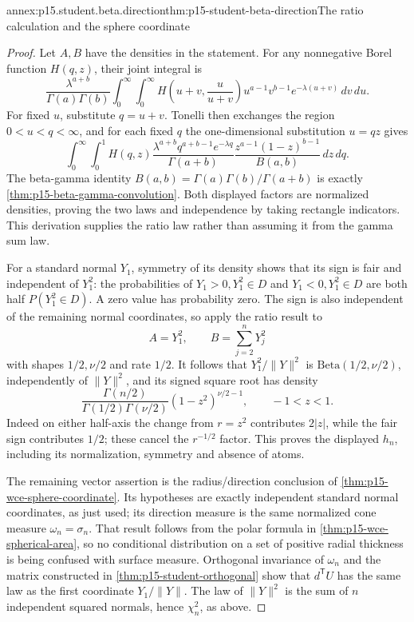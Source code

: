 \begin{annexitem}{annex:p15.student.beta.direction}{thm:p15-student-beta-direction}{The ratio calculation and the sphere coordinate}
\begin{proof}
Let \(A,B\) have the densities in the statement.
For any nonnegative Borel function \(H(q,z)\), their joint
integral is
\[
 \frac{\lambda^{a+b}}{\Gamma(a)\Gamma(b)}
 \int_0^\infty\int_0^\infty
 H\!\left(u+v,\frac{u}{u+v}\right)
 u^{a-1}v^{b-1}e^{-\lambda(u+v)}\,dv\,du .
\]
For fixed \(u\), substitute \(q=u+v\). Tonelli then
exchanges the region \(0<u<q<\infty\), and for each fixed
\(q\) the one-dimensional substitution \(u=qz\) gives
\[
 \int_0^\infty\int_0^1 H(q,z)
 \frac{\lambda^{a+b}q^{a+b-1}e^{-\lambda q}}
      {\Gamma(a+b)}
 \frac{z^{a-1}(1-z)^{b-1}}{B(a,b)}\,dz\,dq .
\]
The beta-gamma identity
\(B(a,b)=\Gamma(a)\Gamma(b)/\Gamma(a+b)\)
is exactly \cref{thm:p15-beta-gamma-convolution}.
Both displayed factors are normalized densities, proving
the two laws and independence by taking rectangle indicators.
This derivation supplies the ratio law rather than assuming
it from the gamma sum law.

For a standard normal \(Y_1\), symmetry of its density
shows that its sign is fair and independent of \(Y_1^2\):
the probabilities of \(Y_1>0,Y_1^2\in D\) and
\(Y_1<0,Y_1^2\in D\) are both half
\(P(Y_1^2\in D)\). A zero value has probability zero.
The sign is also independent of the remaining normal
coordinates, so apply the ratio result to
\[
       A=Y_1^2,\qquad B=\sum_{j=2}^nY_j^2
\]
with shapes \(1/2,\nu/2\) and rate \(1/2\).
It follows that \(Y_1^2/\|Y\|^2\) is
\(\mathrm{Beta}(1/2,\nu/2)\), independently of
\(\|Y\|^2\), and its signed square root has density
\[
 \frac{\Gamma(n/2)}{\Gamma(1/2)\Gamma(\nu/2)}
 (1-z^2)^{\nu/2-1},\qquad -1<z<1.
\]
Indeed on either half-axis the change from \(r=z^2\)
contributes \(2|z|\), while the fair sign contributes
\(1/2\); these cancel the \(r^{-1/2}\) factor.
This proves the displayed \(h_n\), including its
normalization, symmetry and absence of atoms.

The remaining vector assertion is the radius/direction
conclusion of \cref{thm:p15-wce-sphere-coordinate}.
Its hypotheses are exactly independent standard normal
coordinates, as just used; its direction measure is the
same normalized cone measure \(\omega_n=\sigma_n\).
That result follows from the polar formula in
\cref{thm:p15-wce-spherical-area}, so no conditional
distribution on a set of positive radial thickness is
being confused with surface measure.
Orthogonal invariance of \(\omega_n\) and the matrix
constructed in \cref{thm:p15-student-orthogonal}
show that \(d^{\mathsf T}U\) has the same law as
the first coordinate \(Y_1/\|Y\|\). The law of
\(\|Y\|^2\) is the sum of \(n\) independent squared
normals, hence \(\chi_n^2\), as above.
\end{proof}
\end{annexitem}

